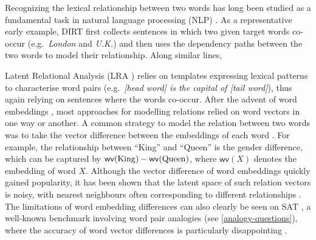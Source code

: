\documentclass[3p]{elsarticle}
\begin{document}
Recognizing the lexical relationship between two words has long been studied as a fundamental task in natural language processing (NLP) \cite{Turney:2005:MSS:1642293.1642475}.  As a representative early example, DIRT \cite{Lin2001} first collects sentences in which two given target words co-occur (e.g.\ \emph{London} and \emph{U.K.}) and then uses the dependency paths between the two words to model their relationship. Along similar lines, {Latent Relational Analysis (LRA \cite{Turney:2005:MSS:1642293.1642475}) relies on templates expressing lexical patterns to characterise word pairs (e.g.\ \emph{[head word] is the capital of [tail word]}), thus again relying on sentences where the words co-occur. After the advent of word embeddings \cite{mikolov2013distributed,pennington-etal-2014-glove,bojanowski2016enriching}, most approaches for modelling relations relied on word vectors in one way or another. A common strategy to model the relation between two words was to take the vector difference between the embeddings of each word \cite{mikolov2013distributed,gladkova-etal-2016-analogy,vylomova-etal-2016-take}. For example, the relationship between ``King'' and ``Queen'' is the gender difference, which can be captured by $\mathsf{wv}({\rm King}) - \mathsf{wv}({\rm Queen})$, where $\mathsf{wv}(X)$ denotes the embedding of word $X$. Although the vector difference of word embeddings quickly gained popularity, it has been shown that the latent space of such relation vectors is noisy, with nearest neighbours often corresponding to different relationships \cite{linzen-2016-issues,drozd-etal-2016-word,bouraoui-etal-2018-relation}. The limitations of word embedding differences can also clearly be seen on SAT \cite{DBLP:conf/ranlp/TurneyLBS03}, a well-known benchmark involving word pair analogies (see \autoref{analogy-questions}), where the accuracy of word vector differences is particularly disappointing \cite{ushio-etal-2021-bert}.

}
\end{document}
